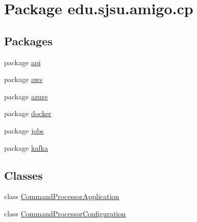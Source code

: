 \hypertarget{namespaceedu_1_1sjsu_1_1amigo_1_1cp}{}\section{Package edu.\+sjsu.\+amigo.\+cp}
\label{namespaceedu_1_1sjsu_1_1amigo_1_1cp}
\subsection*{Packages}
\begin{DoxyCompactItemize}
\item 
package \hyperlink{namespaceedu_1_1sjsu_1_1amigo_1_1cp_1_1api}{api}
\item 
package \hyperlink{namespaceedu_1_1sjsu_1_1amigo_1_1cp_1_1aws}{aws}
\item 
package \hyperlink{namespaceedu_1_1sjsu_1_1amigo_1_1cp_1_1azure}{azure}
\item 
package \hyperlink{namespaceedu_1_1sjsu_1_1amigo_1_1cp_1_1docker}{docker}
\item 
package \hyperlink{namespaceedu_1_1sjsu_1_1amigo_1_1cp_1_1jobs}{jobs}
\item 
package \hyperlink{namespaceedu_1_1sjsu_1_1amigo_1_1cp_1_1kafka}{kafka}
\end{DoxyCompactItemize}
\subsection*{Classes}
\begin{DoxyCompactItemize}
\item 
class \hyperlink{classedu_1_1sjsu_1_1amigo_1_1cp_1_1_command_processor_application}{Command\+Processor\+Application}
\item 
class \hyperlink{classedu_1_1sjsu_1_1amigo_1_1cp_1_1_command_processor_configuration}{Command\+Processor\+Configuration}
\end{DoxyCompactItemize}
